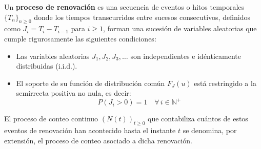 \begin{definicion}
    Un \textbf{proceso de renovación} es una secuencia de eventos o hitos temporales $\{T_n\}_{n \ge 0}$ donde los tiempos transcurridos entre sucesos consecutivos, definidos como $J_i = T_i - T_{i-1}$ para $i \ge 1$, forman una sucesión de variables aleatorias que cumple rigurosamente las siguientes condiciones:
    \begin{itemize}
        \item Las variables aleatorias $J_1, J_2, J_3, \dots$ son independientes e idénticamente distribuidas (i.i.d.).
        \item El soporte de su función de distribución común $F_J(u)$ está restringido a la semirrecta positiva no nula, es decir:
        \[ P(J_i > 0) = 1 \quad \forall \, i \in \mathbb{N}^+ \]
    \end{itemize}
\end{definicion}

\begin{observacion}
    El proceso de conteo continuo $(N(t))_{t \ge 0}$ que contabiliza cuántos de estos eventos de renovación han acontecido hasta el instante $t$ se denomina, por extensión, el proceso de conteo asociado a dicha renovación.
\end{observacion}

